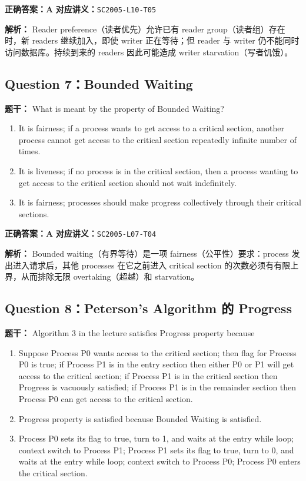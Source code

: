 \documentclass[11pt,a4paper,fontset=fandol]{ctexart}
\renewcommand{\exercisequestion}[2]{%
  \Needspace{5\baselineskip}%
  \subsection{#2}\label{exercise:#1}%
}
\renewenvironment{checkedsolution}
  {\par\nopagebreak[4]\textbf{解析：}\ignorespaces}
  {\par}
\begin{document}
\textbf{正确答案：A}\qquad
\textbf{对应讲义：}\texttt{SC2005-L10-T05}

\begin{checkedsolution}
Reader preference（读者优先）允许已有 reader group（读者组）存在时，新 readers 继续加入，即使 writer 正在等待；但 reader 与 writer 仍不能同时访问数据库。持续到来的 readers 因此可能造成 writer starvation（写者饥饿）。
\end{checkedsolution}

\exercisequestion{SC2005-HW03-Q07}{Question 7：Bounded Waiting}

\textbf{题干：} What is meant by the property of Bounded Waiting?

\begin{enumerate}[label=\Alph*.,leftmargin=2.4em]
  \item It is fairness; if a process wants to get access to a critical section, another process cannot get access to the critical section repeatedly infinite number of times.
  \item It is liveness; if no process is in the critical section, then a process wanting to get access to the critical section should not wait indefinitely.
  \item It is fairness; processes should make progress collectively through their critical sections.
\end{enumerate}

\textbf{正确答案：A}\qquad
\textbf{对应讲义：}\texttt{SC2005-L07-T04}

\begin{checkedsolution}
Bounded waiting（有界等待）是一项 fairness（公平性）要求：process 发出进入请求后，其他 processes 在它之前进入 critical section 的次数必须有有限上界，从而排除无限 overtaking（超越）和 starvation。
\end{checkedsolution}

\exercisequestion{SC2005-HW03-Q08}{Question 8：Peterson's Algorithm 的 Progress}

\textbf{题干：} Algorithm 3 in the lecture satisfies Progress property because

\begin{enumerate}[label=\Alph*.,leftmargin=2.4em]
  \item Suppose Process P0 wants access to the critical section; then flag for Process P0 is true; if Process P1 is in the entry section then either P0 or P1 will get access to the critical section; if Process P1 is in the critical section then Progress is vacuously satisfied; if Process P1 is in the remainder section then Process P0 can get access to the critical section.
  \item Progress property is satisfied because Bounded Waiting is satisfied.
  \item Process P0 sets its flag to true, turn to 1, and waits at the entry while loop; context switch to Process P1; Process P1 sets its flag to true, turn to 0, and waits at the entry while loop; context switch to Process P0; Process P0 enters the critical section.
\end{enumerate}
\end{document}
